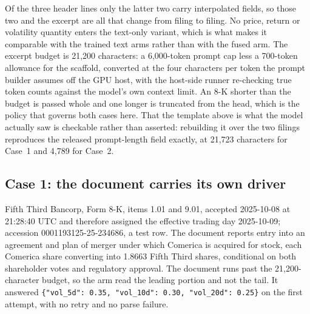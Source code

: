 Of the three header lines only the latter two carry interpolated fields, so
those two and the excerpt are all that change from filing to filing. No
price, return or volatility quantity enters the text-only variant, which is
what makes it comparable with the trained text arms rather than with the
fused arm. The excerpt budget is 21{,}200 characters: a 6{,}000-token prompt
cap less a 700-token allowance for the scaffold, converted at the four
characters per token the prompt builder assumes off the GPU host, with the
host-side runner re-checking true token counts against the model's own context
limit. An 8-K shorter than the budget is passed whole and one longer is
truncated from the head, which is the policy that governs both cases here. %
That the template above is what the model actually saw is checkable rather
than asserted: rebuilding it over the two filings reproduces the released
prompt-length field exactly, at 21{,}723 characters for Case~1 and 4{,}789 for
Case~2. %

\subsection*{Case 1: the document carries its own driver}

Fifth Third Bancorp, Form 8-K, items 1.01 and 9.01, accepted 2025-10-08 at
21:28:40 UTC and therefore assigned the effective trading day 2025-10-09;
accession 0001193125-25-234686, a test row. %
The document reports entry into an agreement and plan of merger under which
Comerica is acquired for stock, each Comerica share converting into 1.8663
Fifth Third shares, conditional on both shareholder votes and regulatory
approval. %
The document runs past the 21{,}200-character budget, so the arm
read the leading portion and not the tail. %
It answered \texttt{\{"vol\_5d": 0.35, "vol\_10d": 0.30, "vol\_20d": 0.25\}}
on the first attempt, with no retry and no parse failure. %

